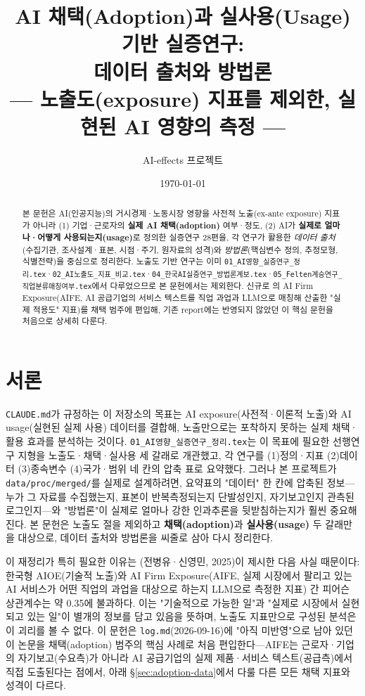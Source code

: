 \documentclass[11pt]{article}
\title{AI 채택(Adoption)과 실사용(Usage) 기반 실증연구:\\[1mm]
데이터 출처와 방법론\\[2mm]
\large --- 노출도(exposure) 지표를 제외한, 실현된 AI 영향의 측정 ---}
\author{AI-effects 프로젝트}
\date{\today}
\begin{document}
\maketitle

\begin{abstract}
\noindent 본 문헌은 AI(인공지능)의 거시경제·노동시장 영향을 사전적 노출(ex-ante exposure) 지표가 아니라 (1) 기업·근로자의 \textbf{실제 AI 채택(adoption)} 여부·정도, (2) AI가 \textbf{실제로 얼마나·어떻게 사용되는지(usage)}로 정의한 실증연구 28편을, 각 연구가 활용한 \emph{데이터 출처}(수집기관, 조사설계·표본, 시점·주기, 원자료의 성격)와 \emph{방법론}(핵심변수 정의, 추정모형, 식별전략)을 중심으로 정리한다. 노출도 기반 연구는 이미 \texttt{01\_AI영향\_실증연구\_정리.tex}·\texttt{02\_AI노출도\_지표\_비교.tex}·\texttt{04\_한국AI실증연구\_방법론계보.tex}·\texttt{05\_Felten계승연구\_직업분류매칭여부.tex}에서 다루었으므로 본 문헌에서는 제외한다. 신규로 \citet{cheon-2025-ai-exposure-vs-ai-adoption}의 AI Firm Exposure(AIFE, AI 공급기업의 서비스 텍스트를 직업 과업과 LLM으로 매칭해 산출한 "실제 적용도" 지표)를 채택 범주에 편입해, 기존 report에는 반영되지 않았던 이 핵심 문헌을 처음으로 상세히 다룬다.
\end{abstract}

\tableofcontents

\section{서론}

\texttt{CLAUDE.md}가 규정하는 이 저장소의 목표는 AI exposure(사전적·이론적 노출)와 AI usage(실현된 실제 사용) 데이터를 결합해, 노출만으로는 포착하지 못하는 실제 채택·활용 효과를 분석하는 것이다. \texttt{01\_AI영향\_실증연구\_정리.tex}는 이 목표에 필요한 선행연구 지형을 노출도·채택·실사용 세 갈래로 개관했고, 각 연구를 (1)정의·지표 (2)데이터 (3)종속변수 (4)국가·범위 네 칸의 압축 표로 요약했다. 그러나 본 프로젝트가 \texttt{data/proc/merged/}를 실제로 설계하려면, 요약표의 "데이터" 한 칸에 압축된 정보—누가 그 자료를 수집했는지, 표본이 반복측정되는지 단발성인지, 자기보고인지 관측된 로그인지—와 "방법론"이 실제로 얼마나 강한 인과추론을 뒷받침하는지가 훨씬 중요해진다. 본 문헌은 노출도 절을 제외하고 \textbf{채택(adoption)}과 \textbf{실사용(usage)} 두 갈래만을 대상으로, 데이터 출처와 방법론을 씨줄로 삼아 다시 정리한다.

이 재정리가 특히 필요한 이유는 \citet{cheon-2025-ai-exposure-vs-ai-adoption}(전병유·신영민, 2025)이 제시한 다음 사실 때문이다: 한국형 AIOE(기술적 노출)와 AI Firm Exposure(AIFE, 실제 시장에서 팔리고 있는 AI 서비스가 어떤 직업의 과업을 대상으로 하는지 LLM으로 측정한 지표) 간 피어슨 상관계수는 약 0.35에 불과하다. 이는 "기술적으로 가능한 일"과 "실제로 시장에서 실현되고 있는 일"이 별개의 정보를 담고 있음을 뜻하며, 노출도 지표만으로 구성된 분석은 이 괴리를 볼 수 없다. 이 문헌은 \texttt{log.md}(2026-09-16)에 "아직 미반영"으로 남아 있던 이 논문을 채택(adoption) 범주의 핵심 사례로 처음 편입한다—AIFE는 근로자·기업의 자기보고(수요측)가 아니라 AI 공급기업의 실제 제품·서비스 텍스트(공급측)에서 직접 도출된다는 점에서, 아래 \S\ref{sec:adoption-data}에서 다룰 다른 모든 채택 지표와 성격이 다르다.
\end{document}

